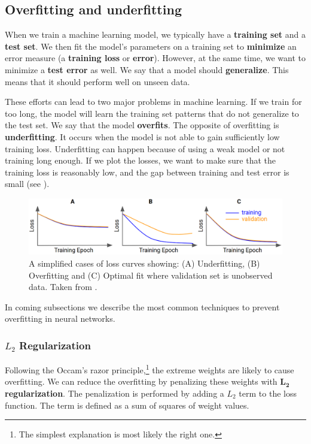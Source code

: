 
\subsection{Overfitting and underfitting}

When we train a machine learning model, we typically have a
\textbf{training set} and a \textbf{test set}. We then fit the model's
parameters on a training set to \textbf{minimize} an error measure
(a \textbf{training loss} or \textbf{error}). However, at the same time, we want
to minimize a \textbf{test error} as well. We say that a model should
\textbf{generalize}. This means that it should perform well on unseen data.

These efforts can lead to two major problems in machine learning. If we train
for too long, the model will learn the training set patterns that do not
generalize to the test set. We say that the model \textbf{overfits}. The
opposite of overfitting is \textbf{underfitting}. It occurs when the model is
not able to gain sufficiently low training loss. Underfitting can happen because
of using a weak model or not training long enough. If we plot the losses, we
want to make sure that the training loss is reasonably low, and the gap between
training and test error is small (see ).

\begin{figure}[h]
    \centering
    \includegraphics[width=\linewidth]{Sources/Figures/fitting.png}
    \caption{A simplified cases of loss curves showing:
        (A) Underfitting, (B) Overfitting and (C) Optimal fit where validation
        set is unobserved data. Taken from
        \cite{bileschi2020deep}.}
    \label{fig:loss_plot}
\end{figure}

In coming subsections we describe the most common techniques to prevent
overfitting in neural networks.

\subsubsection{$L_2$ Regularization}
Following the Occam's razor principle,\footnote{The simplest explanation is most
    likely the right one.} the extreme weights are likely to cause overfitting. We
can reduce the overfitting by penalizing these weights with $\boldsymbol{L_2}$
\textbf{regularization}. The penalization is performed by adding a $L_2$ term to
the loss function. The term is defined as a sum of squares of weight values.

